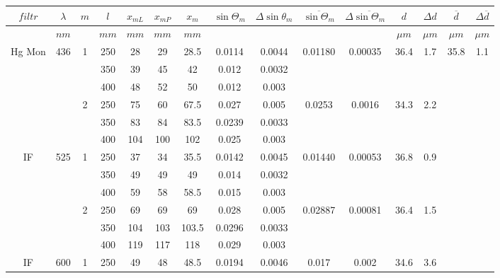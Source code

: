 \documentclass[wide,a4paper,titlepage,12pt]{mwart}
\begin{document}
\begin{sidewaystable}[h] 
	\begin{center}
		\begin{tabular}
			{|c|c|c|c|c|c|c|c|c|c|c|c|c|c|c|} \hline $filtr$ & $\lambda$ & $m$ & $l$ & $x_{mL}$ & $x_{mP}$ & $x_m$ & $\sin{\Theta_m}$ & $\Delta \sin{\theta_m}$ & $\overline{\sin{\Theta_m}}$ & $\Delta \overline{\sin{\Theta_m}}$ & $d$ & $\Delta d $ & $\overline{d} $ & $\Delta \overline{d} $ \\
			\hline & $nm$ & & $mm$ & $mm$ & $mm$ & $mm$ & & & & & $\mu m$ & $\mu m$ & $\mu m$ & $\mu m$ \\
			\hline
			
			\multirow{6}{*}{Hg Mon} & \multirow{6}{*}{436} & \multirow{3}{*}{1} & 250 & 28 & 29 & 28.5 & 0.0114 & 0.0044 & \multirow{3}{*}{0.01180} & \multirow{3}{*}{0.00035} & \multirow{3}{*}{36.4} & \multirow{3}{*}{1.7} & \multirow{18}{*}{35.8} & \multirow{18}{*}{1.1} \\
			& & & 350 & 39 & 45 & 42 & 0.012 & 0.0032 & & & & & & \\
			& & & 400 & 48 & 52 & 50 & 0.012 & 0.003 & & & & & & \\
			\cline{3-13} & & \multirow{3}{*}{2} & 250 & 75 & 60 & 67.5 & 0.027 & 0.005 & \multirow{3}{*}{0.0253} & \multirow{3}{*}{0.0016} & \multirow{3}{*}{34.3} & \multirow{3}{*}{2.2} & & \\
			& & & 350 & 83 & 84 & 83.5 & 0.0239 & 0.0033 & & & & & & \\
			& & & 400 & 104 & 100 & 102 & 0.025 & 0.003 & & & & & & \\
			\cline{1-13} \multirow{6}{*}{IF} & \multirow{6}{*}{525} & \multirow{3}{*}{1} & 250 & 37 & 34 & 35.5 & 0.0142 & 0.0045 & \multirow{3}{*}{0.01440} & \multirow{3}{*}{0.00053} & \multirow{3}{*}{36.8} & \multirow{3}{*}{0.9} & & \\
			& & & 350 & 49 & 49 & 49 & 0.014 & 0.0032 & & & & & & \\
			& & & 400 & 59 & 58 & 58.5 & 0.015 & 0.003 & & & & & & \\
			\cline{3-13} & & \multirow{3}{*}{2} & 250 & 69 & 69 & 69 & 0.028 & 0.005 & \multirow{3}{*}{0.02887} & \multirow{3}{*}{0.00081} & \multirow{3}{*}{36.4} & \multirow{3}{*}{1.5} & & \\
			& & & 350 & 104 & 103 & 103.5 & 0.0296 & 0.0033 & & & & & & \\
			& & & 400 & 119 & 117 & 118 & 0.029 & 0.003 & & & & & & \\
			\cline{1-13} \multirow{6}{*}{IF} & \multirow{6}{*}{600} & \multirow{3}{*}{1} & 250 & 49 & 48 & 48.5 & 0.0194 & 0.0046 & \multirow{3}{*}{0.017} & \multirow{3}{*}{0.002} & \multirow{3}{*}{34.6} & \multirow{3}{*}{3.6} & & \\

\end{tabular}
\end{center}
\end{sidewaystable}
\end{document}
